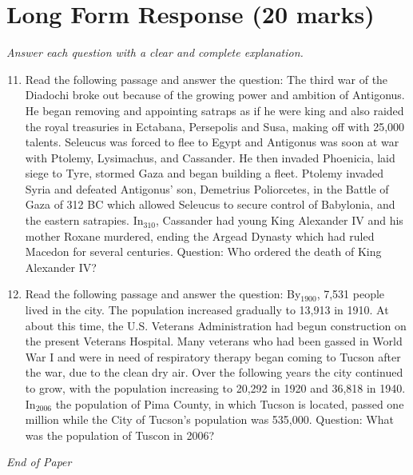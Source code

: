 \documentclass[12pt]{article}
\begin{document}
\section*{Long Form Response (20 marks)}
\textit{Answer each question with a clear and complete explanation.}
\begin{enumerate}[label=\arabic*.]
\setcounter{enumi}{10}
\item Read the following passage and answer the question: The third war of the Diadochi broke out because of the growing power and ambition of Antigonus. He began removing and appointing satraps as if he were king and also raided the royal treasuries in Ectabana, Persepolis and Susa, making off with 25,000 talents. Seleucus was forced to flee to Egypt and Antigonus was soon at war with Ptolemy, Lysimachus, and Cassander. He then invaded Phoenicia, laid siege to Tyre, stormed Gaza and began building a fleet. Ptolemy invaded Syria and defeated Antigonus' son, Demetrius Poliorcetes, in the Battle of Gaza of 312 BC which allowed Seleucus to secure control of Babylonia, and the eastern satrapies. In$_{310}$, Cassander had young King Alexander IV and his mother Roxane murdered, ending the Argead Dynasty which had ruled Macedon for several centuries. Question: Who ordered the death of King Alexander IV?
\item Read the following passage and answer the question: By$_{1900}$, 7,531 people lived in the city. The population increased gradually to 13,913 in 1910. At about this time, the U.S. Veterans Administration had begun construction on the present Veterans Hospital. Many veterans who had been gassed in World War I and were in need of respiratory therapy began coming to Tucson after the war, due to the clean dry air. Over the following years the city continued to grow, with the population increasing to 20,292 in 1920 and 36,818 in 1940. In$_{2006}$ the population of Pima County, in which Tucson is located, passed one million while the City of Tucson's population was 535,000. Question: What was the population of Tuscon in 2006?
\end{enumerate}

\vfill
\noindent\textit{End of Paper}
\end{document}
